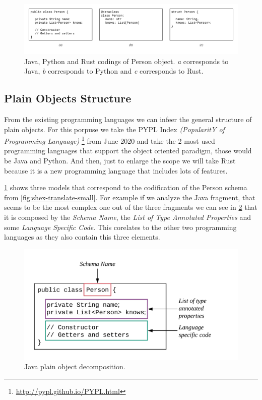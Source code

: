\begin{figure}
    \includegraphics[width=\textwidth]{images/codings-exmaple.png}
    \centering
    \caption[Java, Python and Rust codings of Person object.]{Java, Python and Rust codings of Person object. 
    \textit{a} corresponds to Java, \textit{b} corresponds to Python and \textit{c} corresponds to Rust.}
    \label{fig:person-codings}
\end{figure}


\subsection{Plain Objects Structure}
From the existing programming languages we can infeer the general structure of plain objects. For this porpuse
we take the PYPL Index \textit{(PopularitY of Programming Language)} \footnote{\url{http://pypl.github.io/PYPL.html}}
from June 2020 and take the 2 most used programming languages that support the object oriented paradigm,
those would be Java and Python. And then, just to enlarge the scope we will take Rust because it is a new programming
language that includes lots of features.

\cref{fig:person-codings} shows three models that correspond to the codification of the Person schema from
\cref{fig:shex-translate-small}. For example if we analyze the Java fragment, that seems to be the most complex
one out of the three fragments we can see in \cref{fig:java-analysis} that it is composed by the \textit{Schema Name},
the \textit{List of Type Annotated Properties} and some \textit{Language Specific Code}. This corelates to the other
two programming languages as they also contain this three elements.

\begin{figure}
    \includegraphics[scale=0.2]{images/java-analysis.png}
    \centering
    \caption[Java plain object decomposition.]{Java plain object decomposition.}
    \label{fig:java-analysis}
\end{figure}

